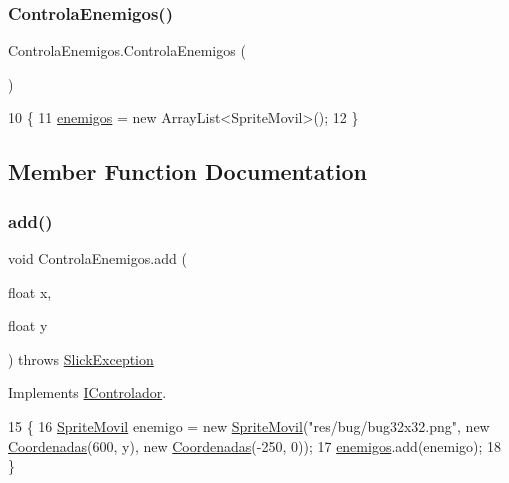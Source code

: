 \subsubsection{\texorpdfstring{Controla\+Enemigos()}{ControlaEnemigos()}}
{\footnotesize\ttfamily Controla\+Enemigos.\+Controla\+Enemigos (\begin{DoxyParamCaption}{ }\end{DoxyParamCaption})\hspace{0.3cm}{\ttfamily [inline]}}


\begin{DoxyCode}
10                              \{
11         \mbox{\hyperlink{class_controla_enemigos_a00bc1b9f42ef341339d0d7a00ed60319}{enemigos}} = \textcolor{keyword}{new} ArrayList<SpriteMovil>();
12     \}
\end{DoxyCode}


\subsection{Member Function Documentation}
\mbox{\label{class_controla_enemigos_a891536374c60a0b946b72a3c02458952}} 
\subsubsection{\texorpdfstring{add()}{add()}}
{\footnotesize\ttfamily void Controla\+Enemigos.\+add (\begin{DoxyParamCaption}\item[{float}]{x,  }\item[{float}]{y }\end{DoxyParamCaption}) throws \mbox{\hyperlink{classorg_1_1newdawn_1_1slick_1_1_slick_exception}{Slick\+Exception}}\hspace{0.3cm}{\ttfamily [inline]}}



Implements \mbox{\hyperlink{interface_i_controlador_af6e795781b2eead3e435cbbdd61bde41}{I\+Controlador}}.


\begin{DoxyCode}
15                                                             \{
16       \mbox{\hyperlink{class_sprite_movil}{SpriteMovil}} enemigo = \textcolor{keyword}{new} \mbox{\hyperlink{class_sprite_movil}{SpriteMovil}}(\textcolor{stringliteral}{"res/bug/bug32x32.png"}, \textcolor{keyword}{new} 
      \mbox{\hyperlink{class_coordenadas}{Coordenadas}}(600, y), \textcolor{keyword}{new} \mbox{\hyperlink{class_coordenadas}{Coordenadas}}(-250, 0));
17       \mbox{\hyperlink{class_controla_enemigos_a00bc1b9f42ef341339d0d7a00ed60319}{enemigos}}.add(enemigo);
18     \}
\end{DoxyCode}
\mbox{\label{class_controla_enemigos_a3ae667fde8e2bf5a38a4ada28ac6db26}} 
